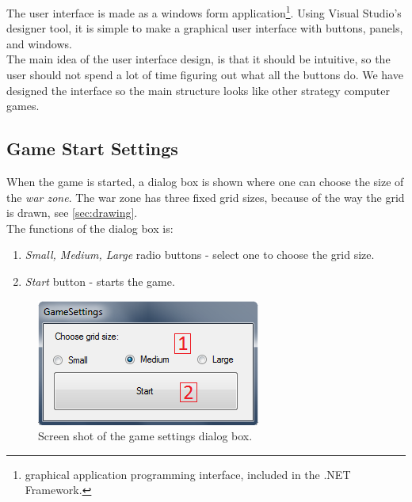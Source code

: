 The user interface is made as a windows form application\footnote{graphical application programming interface, included in the .NET Framework.}. Using Visual Studio's designer tool, it is simple to make a graphical user interface with buttons, panels, and windows.\\
   The main idea of the user interface design, is that it should be intuitive, so the user should not spend a lot of time figuring out what all the buttons do. We have designed the interface so the main structure looks like other strategy computer games.
	
\subsection*{Game Start Settings}
When the game is started, a dialog box is shown where one can choose the size of the \textit{war zone}. The war zone has three fixed grid sizes, because of the way the grid is drawn, see \ref{sec:drawing}.\\
   The functions of the dialog box is:
\begin{enumerate}
	\item \textit{Small, Medium, Large} radio buttons - select one to choose the grid size.
	\item \textit{Start} button - starts the game.
\end{enumerate}

\begin{figure}[H]
\begin{center}
\includegraphics[scale=0.9]{Images/dialog.png}
\end{center}
\caption{Screen shot of the game settings dialog box.}
\label{dialog}
\end{figure}

